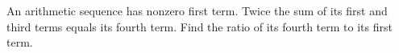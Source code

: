 An arithmetic sequence has nonzero first term. Twice the sum of its first and third terms equals its fourth term. Find the ratio of its fourth term to its first term.
